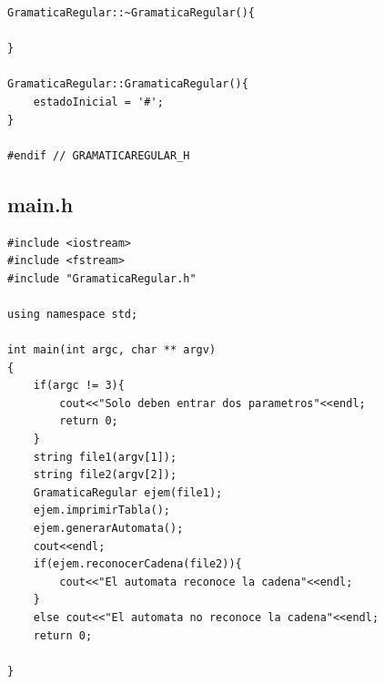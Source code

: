\documentclass[a4paper,12pt]{article}
\begin{document}
\begin{lstlisting}
GramaticaRegular::~GramaticaRegular(){

}

GramaticaRegular::GramaticaRegular(){
    estadoInicial = '#';
}

#endif // GRAMATICAREGULAR_H
\end{lstlisting}
      \subsection{main.h}
	\begin{lstlisting}
#include <iostream>
#include <fstream>
#include "GramaticaRegular.h"

using namespace std;

int main(int argc, char ** argv)
{
    if(argc != 3){
        cout<<"Solo deben entrar dos parametros"<<endl;
        return 0;
    }
    string file1(argv[1]);
    string file2(argv[2]);
    GramaticaRegular ejem(file1);
    ejem.imprimirTabla();
    ejem.generarAutomata();
    cout<<endl;
    if(ejem.reconocerCadena(file2)){
        cout<<"El automata reconoce la cadena"<<endl;
    }
    else cout<<"El automata no reconoce la cadena"<<endl;
    return 0;

}

	\end{lstlisting}
\end{document}
